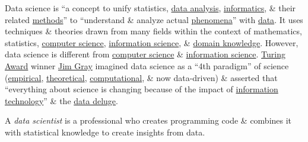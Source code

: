 \documentclass{article}
\begin{document}
Data science is ``a concept to unify statistics, \href{https://en.wikipedia.org/wiki/Data_analysis}{data analysis}, \href{https://en.wikipedia.org/wiki/Informatics}{informatics}, \& their related \href{https://en.wikipedia.org/wiki/Scientific_method}{methods}'' to ``understand \& analyze actual \href{https://en.wikipedia.org/wiki/Phenomena}{phenomena}'' with \href{https://en.wikipedia.org/wiki/Data}{data}. It uses techniques \& theories drawn from many fields within the context of mathematics, statistics, \href{https://en.wikipedia.org/wiki/Computer_science}{computer science}, \href{https://en.wikipedia.org/wiki/Information_science}{information science}, \& \href{https://en.wikipedia.org/wiki/Domain_knowledge}{domain knowledge}. However, data science is different from \href{https://en.wikipedia.org/wiki/Computer_science}{computer science} \& \href{https://en.wikipedia.org/wiki/Information_science}{information science}. \href{https://en.wikipedia.org/wiki/Turing_Award}{Turing Award} winner \href{https://en.wikipedia.org/wiki/Jim_Gray_(computer_scientist)}{Jim Gray} imagined data science as a ``4th paradigm'' of science (\href{https://en.wikipedia.org/wiki/Empirical_research}{empirical}, \href{https://en.wikipedia.org/wiki/Basic_research}{theoretical}, \href{https://en.wikipedia.org/wiki/Computational_science}{computational}, \& now data-driven) \& asserted that ``everything about science is changing because of the impact of \href{https://en.wikipedia.org/wiki/Information_technology}{information technology}'' \& the \href{https://en.wikipedia.org/wiki/Information_explosion}{data deluge}.

A {\it data scientist} is a professional who creates programming code \& combines it with statistical knowledge to create insights from data.
\end{document}

